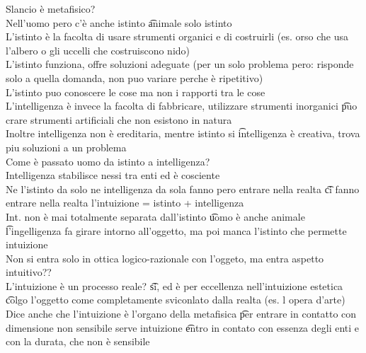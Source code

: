 \documentclass[12pt]{article}
\begin{document}
Slancio è metafisico? \\
Nell'uomo pero c'è anche istinto \t animale solo istinto \\
L'istinto è la facolta di usare strumenti organici e di costruirli (es. orso che usa l'albero o gli uccelli che costruiscono nido) \\
L'istinto funziona, offre soluzioni adeguate (per un solo problema pero: risponde solo a quella domanda, non puo variare perche è ripetitivo) \\
L'istinto puo conoscere le cose ma non i rapporti tra le cose \\
L'intelligenza è invece la facolta di fabbricare, utilizzare strumenti inorganici \t puo crare strumenti artificiali che non esistono in natura \\
Inoltre intelligenza non è ereditaria, mentre istinto si \t intelligenza è creativa, trova piu soluzioni a un problema \\
Come è passato uomo da istinto a intelligenza? \\
Intelligenza stabilisce nessi tra enti ed è cosciente \\
Ne l'istinto da solo ne intelligenza da sola fanno pero entrare nella realta \t ci fanno entrare nella realta l'intuizione = istinto + intelligenza \\
Int. non è mai totalmente separata dall'istinto \t uomo è anche animale \t l'ingelligenza fa girare intorno all'oggetto, ma poi manca l'istinto che permette intuizione \\
Non si entra solo in ottica logico-razionale con l'oggeto, ma entra aspetto intuitivo?? \\
L'intuizione è un processo reale? \t si, ed è per eccellenza nell'intuizione estetica \t colgo l'oggetto come completamente sviconlato dalla realta (es. l opera d'arte) \\
Dice anche che l'intuizione è l'organo della metafisica \t per entrare in contatto con dimensione non sensibile serve intuizione \t entro in contato con essenza degli enti e con la durata, che non è sensibile
\end{document}
